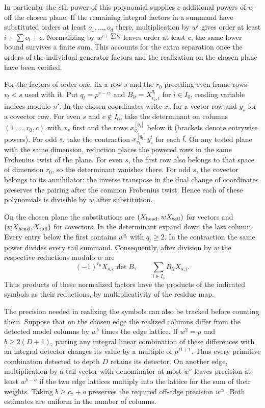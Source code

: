 \documentclass[11pt]{amsart}
\theoremstyle{definition}
\theoremstyle{remark}
\begin{document}
In particular the $c$th power of this polynomial supplies $c$
additional powers of $w$ off the chosen plane. If the remaining
integral factors in a summand have substituted orders at least
$o_1,\ldots,o_d$ there, multiplication by $w^i$ gives order at
least $i+\sum o_l+c$. Normalizing by $w^{i+\sum o_l}$ leaves
order at least $c$; the same lower bound survives a finite sum.
This accounts for the extra separation once the orders of the
individual generator factors and the realization on the chosen
plane have been verified.

For the factors of order one, fix a row $s$ and the $r_0$
preceding even frame rows $v_l<s$ used with it. Put
$q_l=p^{s-v_l}$ and $B_{li}=X_{v_l,i}^{q_l}$ for $i\in I_0$,
reading variable indices modulo $n'$. In the chosen coordinates
write $x_v$ for a vector row and $y_s$ for a covector row.
For even $s$ and $c\notin I_0$, take the determinant on
columns $(1,\ldots,r_0,c)$ with $x_s$ first and the rows
$x_{v_l}^{[q_l]}$ below it (brackets denote entrywise powers).
For odd $s$, take the contraction $x_{v_l}^{[q_l]}y_s^t$
for each $l$. On any tested plane with the same dimension,
reduction places the powered rows in the same Frobenius twist
of the plane. For even $s$, the first row also belongs to that
space of dimension $r_0$, so the determinant vanishes there.
For odd $s$, the covector belongs to its annihilator: the
inverse transpose in the dual change of coordinates preserves
the pairing after the common Frobenius twist. Hence each of
these polynomials is divisible by $w$ after substitution.

On the chosen plane the substitutions are $(X_{\rm head},
wX_{\rm tail})$ for vectors and $(wX_{\rm head},X_{\rm tail})$
for covectors. In the determinant expand down the last column.
Every entry below the first contains $w^{q_l}$ with $q_l\ge2$.
In the contraction the same power divides every tail summand.
Consequently, after division by $w$ the respective reductions
modulo $w$ are
\[
 (-1)^{r_0}X_{s,c}\det B,\qquad
 \sum_{i\in I_0} B_{li}X_{s,i}.
\]
Thus products of these normalized factors have the products of
the indicated symbols as their reductions, by multiplicativity
of the residue map.

The precision needed in realizing the symbols can also be tracked
before counting them. Suppose that on the chosen edge the realized
columns differ from the detected model columns by $w^b$ times the
edge lattice. If $w^2=p$ and $b\ge2(D+1)$, pairing any integral
linear combination of these differences with an integral detector
changes its value by a multiple of $p^{D+1}$. Thus every primitive
combination detected to depth $D$ retains its detector. On another
edge, multiplication by a tail vector with denominator at most
$w^o$ leaves precision at least $w^{b-o}$ if the two edge lattices
multiply into the lattice for the sum of their weights. Taking
$b\ge c_*+o$ preserves the required off-edge precision $w^{c_*}$.
Both estimates are uniform in the number of columns.
\end{document}
